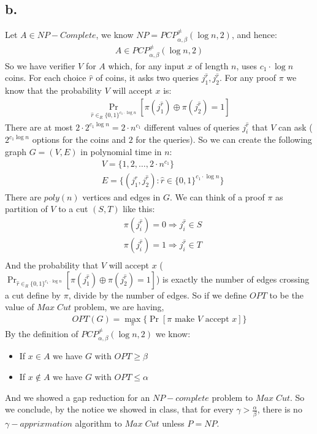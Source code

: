 \documentclass[11pt]{article}
\theoremstyle{plain}
\theoremstyle{nonumberplainnobrackets}
\begin{document}
\subsection*{b.} Let $A\in NP- Complete$, we know $NP=PCP_{\alpha,\beta}^{\ne} (\log n,2) $, and hence:
\begin{align*}
A\in PCP_{\alpha,\beta}^{\ne} (\log n,2) 
\end{align*}
So we have verifier $V$ for $A$ which, for any input $x$ of length $n$, uses $c_1\cdot \log n$ coins. For each choice $\hat{r}$ of coins, it asks two queries $j_1^{\hat{r}},j_2^{\hat{r}}$. For any proof $\pi$ we know that the probability $V$ will accept $x$ is:
\begin{align*}
\Pr_{\hat{r}\in_R \{0,1\}^{c_1\cdot \log n}}[\pi(j_1^{\hat{r}}) \oplus \pi(j_2^{\hat{r}})=1]
\end{align*}
There are at most $2\cdot 2^{c_1\log n} = 2\cdot n^{c_1}$ different values of queries $j_i^{\hat{r}}$ that $V$ can ask ($2^{c_1\log n} $ options for the coins and $2$ for the queries). So we can create the following graph $G=(V,E)$ in polynomial time in $n$:
\begin{align*}
&V= \{1,2,\ldots, 2\cdot n^{c_1} \}\\
&E=\{ (j_1^{\hat{r}},j_2^{\hat{r}}) : {\hat{r}\in \{0,1\}^{c_1\cdot \log n}} \}
\end{align*}
There are $poly(n)$ vertices and edges in $G$.
We can think of a proof $\pi$ as partition of $V$ to a cut $(S,T)$ like this:
\begin{align*}
&\pi(j_i^{\hat{r}})=0 \Rightarrow j_i^{\hat{r}}\in S\\
&\pi(j_i^{\hat{r}})=1 \Rightarrow j_i^{\hat{r}}\in T\\
\end{align*}
And the probability that $V$ will accept $x$ ($\Pr_{\hat{r}\in_R \{0,1\}^{c_1\cdot \log n}}[\pi(j_1^{\hat{r}}) \oplus \pi(j_2^{\hat{r}})=1]$) is exactly the number of edges crossing a cut define by $\pi$, divide by the number of edges.
So if we define $OPT$ to be the value of $Max\;Cut$ problem, we are having,
\begin{align*}
OPT(G) = \max_\pi\{ \Pr [\pi \text{ make $V$ accept $x$}] \}
\end{align*}
By the definition of $PCP_{\alpha,\beta}^{\ne} (\log n,2) $ we know:
\begin{itemize}
	\item If $x\in A$ we have $G$ with $OPT\ge \beta$
		\item If $x\notin A$ we have $G$ with $OPT\le \alpha$
\end{itemize}
And we showed a gap reduction for an $NP-complete$ problem to $Max\;Cut$.
So we conclude, by the notice we showed in class, that for every $\gamma > \frac{\alpha}{\beta}$, there is no $\gamma-apprixmation$ algorithm to $Max\; Cut$ unless $P=NP$.
\end{document}

